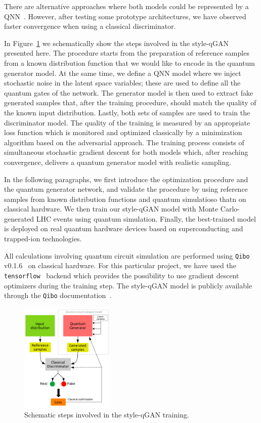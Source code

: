 \documentclass[twocolumn,preprintnumbers,superscriptaddress]{revtex4-2}
\begin{document}
%
There are alternative approaches where both models could be represented by a
QNN~\cite{dallaire2018quantum, hu2019quantum, benedetti2019adversarial, romero2021variational, niu2021entangling}. However, after testing some prototype architectures, we have observed faster convergence when using a classical discriminator.

In Figure~\ref{fig:scheme} we schematically show the steps involved in the style-qGAN
presented here. The procedure starts from the preparation of reference samples from a
known distribution function that we would like to encode in the quantum
generator model. At the same time, we define a QNN model where
we inject stochastic noise in the latent space variables; these are used to
define all the quantum gates of the network. The generator model is then used to extract fake generated samples
that, after the training procedure, should match the quality of the known input
distribution. Lastly, both sets of samples are used to train the discriminator
model. The quality of the training is measured by an appropriate loss function
which is monitored and optimized classically by a minimization algorithm based on
the adversarial approach. The training process consists of simultaneous
stochastic gradient descent for both models which, after reaching convergence,
delivers a quantum generator model with realistic sampling.

In the following paragraphs, we first introduce the optimization procedure and the quantum
generator network, and validate the procedure by using reference samples from known
distribution functions and quantum simulatioso thatn on classical hardware. We then
train our style-qGAN model with Monte Carlo-generated LHC events using quantum
simulation. Finally, the best-trained model is deployed on real quantum hardware
devices based on superconducting and trapped-ion technologies.

All calculations involving quantum circuit simulation are performed using
{\tt Qibo} v0.1.6~\cite{efthymiou2020qibo,stavros_efthymiou_2021_5088103} on
classical hardware. For this particular project, we have used the {\tt
tensorflow}~\cite{tensorflow2015-whitepaper} backend which provides the
possibility to use gradient descent optimizers during the training step. The
style-qGAN model is publicly available through the {\tt Qibo}
documentation~\cite{qGAN_github_model}.

\begin{figure}
  \includegraphics[width=0.4\textwidth]{plots/scheme2.pdf}
  \caption{\label{fig:scheme} Schematic steps involved in the style-qGAN training.}
\end{figure}
\end{document}
